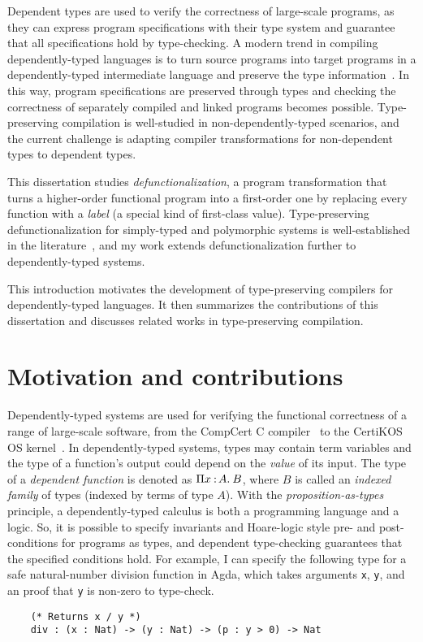 
Dependent types are used to verify the correctness of large-scale programs, as they can express program specifications with their type system and guarantee that all specifications hold by type-checking.
A modern trend in compiling dependently-typed languages is to turn source programs into target programs in a dependently-typed intermediate language and preserve the type information~\cite{bowman2019compiling}. In this way, program specifications are preserved through types and checking the correctness of separately compiled and linked programs becomes possible. Type-preserving compilation is well-studied in non-dependently-typed scenarios, and the current challenge is adapting compiler transformations for non-dependent types to dependent types.
	
This dissertation studies \textit{defunctionalization}, a program transformation that turns a higher-order functional program into a first-order one by replacing every function with a \textit{label} (a special kind of first-class value). Type-preserving defunctionalization for simply-typed and polymorphic systems is well-established in the literature~\cite{DBLP:conf/icfp/BellBH97, DBLP:conf/popl/PottierG04}, and my work extends defunctionalization further to dependently-typed systems.

This introduction motivates the development of type-preserving compilers for dependently-typed languages. It then summarizes the contributions of this dissertation and discusses related works in type-preserving compilation.

\section{Motivation and contributions}

Dependently-typed systems are used for verifying the functional correctness of a range of large-scale software, from the CompCert C compiler~\cite{DBLP:conf/popl/Leroy06} to the CertiKOS OS kernel~\cite{DBLP:conf/popl/GuKRSWWZG15}. 
In dependently-typed systems, types may contain term variables and the type of a function’s output could depend on the \textit{value} of its input. The type of a \textit{dependent function} is denoted as $\Pi x\mkern1.5mu{\hspace{0.5mm}{:}\hspace{0.5mm}} A.\hspace{0.8mm}B$, where $B$ is called an \textit{indexed family} of types (indexed by terms of type $A$).
With the \textit{proposition-as-types} principle, a dependently-typed calculus is both a programming language and a logic. So, it is possible to specify invariants and Hoare-logic style pre- and post-conditions for programs as types, and dependent type-checking guarantees that the specified conditions hold. For example, I can specify the following type for a safe natural-number division function in Agda, which takes arguments \texttt{x}, \texttt{y}, and an proof that \texttt{y} is non-zero to type-check. 
\begin{lstlisting}
	(* Returns x / y *)
	div : (x : Nat) -> (y : Nat) -> (p : y > 0) -> Nat
\end{lstlisting}

